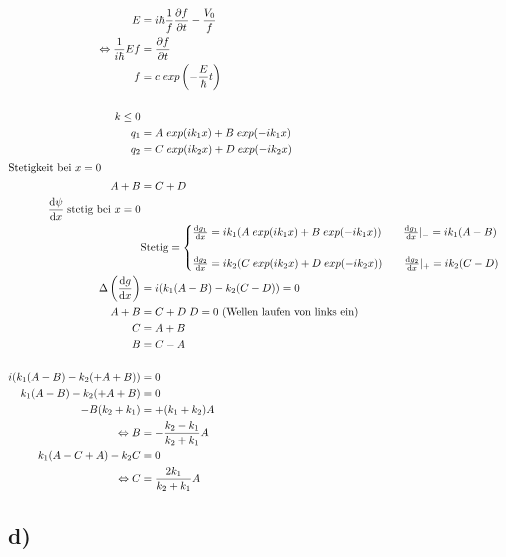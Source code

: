     \begin{align*}
        E &= i\hbar \frac{1}{f} \frac{\partial f}{\partial t} - \frac{V_0}{f}\\
        \Leftrightarrow \frac{1}{i\hbar} Ef &= \frac{\partial f}{\partial t}\\
        f &= c \; exp \left( -\frac{E}{\hbar}t \right)\\
        \\
        k \leq 0\\
        q_1 &= A \; exp(ik_1x) + B \; exp(-ik_1x)\\
        q_2 &= C \; exp(ik_2x) + D \; exp(-ik_2x)\\
        \intertext{Stetigkeit bei $x=0$
        }
        A + B &= C + D\\
        \frac{\mathrm{d}\psi}{\mathrm{d}x} \; \text{stetig bei $x=0$}\\
        &\text{Stetig}=\begin{cases}
            \frac{\mathrm{d} g_1}{\mathrm{d}x} = ik_1 (A\;exp(ik_1x) + B\;exp(-ik_1x)) \qquad \frac{\mathrm{d} g_1}{\mathrm{d}x} \vert_{-} = ik_1(A-B)\\
            \\
            \frac{\mathrm{d} g_2}{\mathrm{d}x} = ik_2 (C\;exp(ik_2x) + D\;exp(-ik_2x)) \qquad \frac{\mathrm{d} g_2}{\mathrm{d}x} \vert_{+} = ik_2(C-D)
        \end{cases}\\
        \Delta \left( \frac{\mathrm{d} g}{\mathrm{d}x} \right) &= i(k_1(A-B) -k_2(C-D)) =0\\
        A+B &= C+D \; \text{$D=0$ (Wellen laufen von links ein)}\\
        C &= A+B\\
        B &= C-A\\
        \\
        i(k_1(A-B) - k_2(+A+B)) &=0\\
        k_1(A-B) - k_2(+A+B) &=0\\
        -B(k_2+k_1) &= +(k_1+k_2)A\\
        \Leftrightarrow B &= -\frac{k_2-k_1}{k_2+k_1}A\\
        k_1(A-C+A)-k_2C &= 0\\
        \Leftrightarrow C &= \frac{2k_1}{k_2+k_1}A
    \end{align*}

\subsection{d)}

